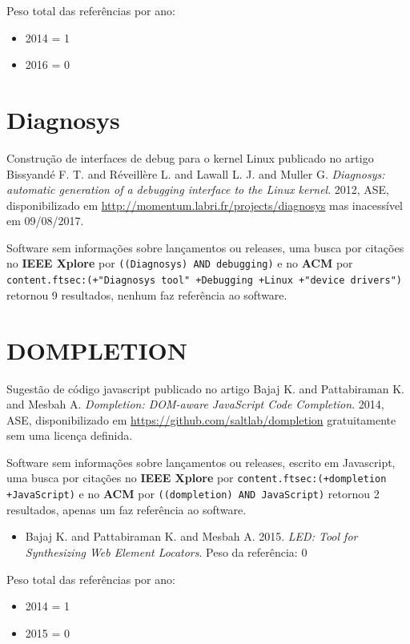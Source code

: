 Peso total das referências por ano:

\begin{itemize}
\item 2014 = 1
\item 2016 = 0
\end{itemize}


\section{Diagnosys}

Construção de interfaces de debug para o kernel Linux
publicado no artigo
Bissyandé F. T. and Réveillère L. and Lawall L. J. and Muller G.
{\it Diagnosys: automatic generation of a debugging interface to the Linux kernel}.
2012,
ASE,
disponibilizado em \url{http://momentum.labri.fr/projects/diagnosys}
mas inacessível em 09/08/2017.

Software sem informações sobre lançamentos ou releases,
uma busca por citações no {\bf IEEE Xplore} por
\texttt{((Diagnosys) AND debugging)}
e no {\bf ACM} por
\texttt{content.ftsec:(+"Diagnosys tool" +Debugging +Linux +"device drivers")}
retornou
9 resultados,
nenhum faz referência ao software.


\section{DOMPLETION}

Sugestão de código javascript
publicado no artigo
Bajaj K. and Pattabiraman K. and Mesbah A.
{\it Dompletion: DOM-aware JavaScript Code Completion}.
2014,
ASE,
disponibilizado em \url{https://github.com/saltlab/dompletion}
gratuitamente
sem uma licença definida.

Software sem informações sobre lançamentos ou releases,
escrito em Javascript,
uma busca por citações no {\bf IEEE Xplore} por
\texttt{content.ftsec:(+dompletion +JavaScript)}
e no {\bf ACM} por
\texttt{((dompletion) AND JavaScript)}
retornou
2 resultados,
apenas um faz referência ao software.

\begin{itemize}
\item Bajaj K. and Pattabiraman K. and Mesbah A.
      2015.
      {\it LED: Tool for Synthesizing Web Element Locators}.
      Peso da referência: 0
\end{itemize}

Peso total das referências por ano:

\begin{itemize}
\item 2014 = 1
\item 2015 = 0
\end{itemize}


